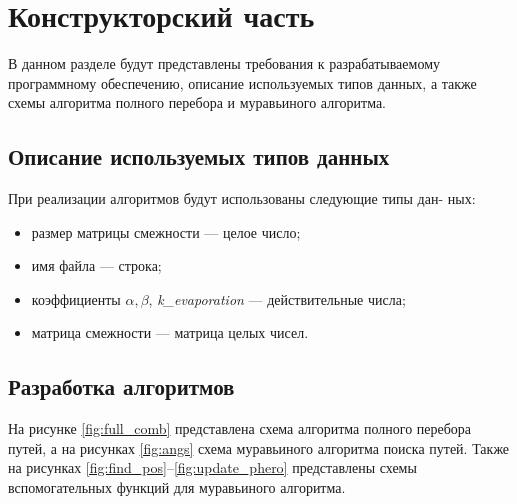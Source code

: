 \chapter{Конструкторский часть}

В данном разделе будут представлены требования к разрабатываемому программному обеспечению, описание используемых типов данных, а также схемы алгоритма полного перебора и муравьиного алгоритма.

\section{Описание используемых типов данных}
При реализации алгоритмов будут использованы следующие типы дан-
ных:
\begin{itemize}[label=---]
	\item размер матрицы смежности --- целое число;
	\item имя файла --- строка;
	\item коэффициенты $\alpha, \beta$, \textit{k\_evaporation} --- действительные числа;
	\item матрица смежности --- матрица целых чисел.
\end{itemize}


\section{Разработка алгоритмов}

 
На рисунке \ref{fig:full_comb} представлена схема алгоритма полного перебора путей, а на рисунках \ref{fig:angs} схема муравьиного алгоритма поиска путей. Также на рисунках \ref{fig:find_pos}--\ref{fig:update_phero} представлены схемы вспомогательных функций для муравьиного алгоритма.

